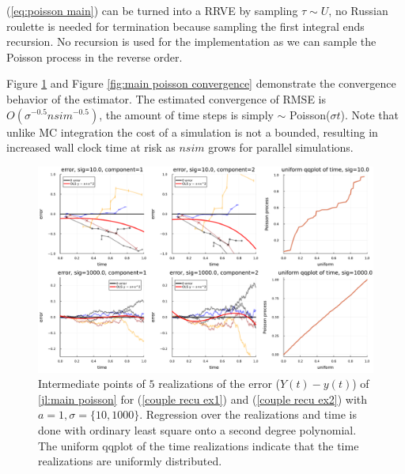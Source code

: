 \documentclass[a4paper,12pt]{article}
\begin{document}
\begin{julia} \label{jl:main poisson}
  (\ref{eq:poisson main}) can be turned into a RRVE by sampling $\tau \sim U$, no Russian roulette is needed for
  termination because sampling the first integral ends recursion. No recursion is used
  for the implementation as we can sample the Poisson process in the reverse order.


  Figure \ref{fig:main poisson error} and Figure \ref{fig:main poisson convergence} demonstrate the convergence
  behavior of the estimator. The estimated convergence of RMSE is $O(\sigma^{-0.5} nsim^{-0.5})$, the amount of
  time steps is simply $\sim$ Poisson($\sigma t$). Note that unlike MC integration the cost of a simulation is not
  a bounded, resulting in increased wall clock time at risk as $nsim$ grows for parallel simulations.

\end{julia}

\begin{figure}[h!]
  \centering
  \includegraphics[width=\textwidth]{julia_plots/main_poisson_error.pdf}
  \caption{
    Intermediate points of $5$ realizations of the error ($Y(t)-y(t)$) of \ref{jl:main poisson} for (\ref{couple recu ex1}) and (\ref{couple recu ex2}) with $a=1, \sigma = \{10,1000\}$.
    Regression over the realizations and time is done with ordinary least square onto
    a second degree polynomial. The uniform qqplot of the time realizations indicate that the time realizations
    are uniformly distributed.
  }
  \label{fig:main poisson error}
\end{figure}
\end{document}
